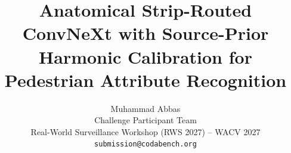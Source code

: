 \documentclass[10pt,twocolumn,letterpaper]{article}
\title{Anatomical Strip-Routed ConvNeXt with Source-Prior Harmonic Calibration for Pedestrian Attribute Recognition}
\author{
  Muhammad Abbas\\
  Challenge Participant Team\\
  Real-World Surveillance Workshop (RWS 2027) -- WACV 2027\\
  {\tt\small submission@codabench.org}
}
\begin{document}
\maketitle

    






{
    \small
    
    
}
\end{document}
